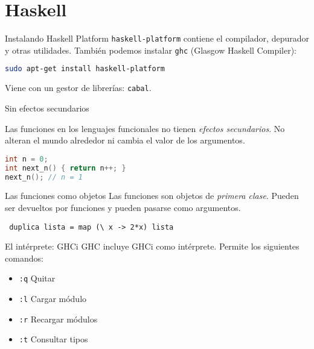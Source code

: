 \section{Haskell}

\begin{frame}[fragile]{Instalando Haskell Platform}
  \texttt{haskell-platform} contiene el compilador, depurador y otras utilidades.
  También podemos instalar \texttt{ghc} (Glasgow Haskell Compiler):
  \espacio
  \begin{lstlisting}[language=bash]
sudo apt-get install haskell-platform
  \end{lstlisting}
  \espacio
  Viene con un gestor de librerías: \texttt{cabal}.
\end{frame}

\begin{frame}[fragile]{Sin efectos secundarios}

    Las funciones en los lenguajes funcionales no tienen \textit{efectos secundarios}.
    No alteran el mundo alrededor ni cambia el valor de los argumentos.
    \espacio
  \begin{lstlisting}[language=C++]
int n = 0;
int next_n() { return n++; }
next_n(); // n = 1
  \end{lstlisting}

\end{frame}

\begin{frame}[fragile]{Las funciones como objetos}
 Las funciones son objetos de \textit{primera clase}. Pueden ser devueltos
 por funciones y pueden pasarse como argumentos.
 
 \begin{lstlisting}
 duplica lista = map (\ x -> 2*x) lista
 \end{lstlisting}


\end{frame}

\begin{frame}{El intérprete: GHCi}
  GHC incluye GHCi como intérprete. Permite los siguientes comandos:
  \espacio
  \begin{itemize}
    \item \texttt{:q} \qquad  Quitar
    \item \texttt{:l} \qquad  Cargar módulo
    \item \texttt{:r} \qquad  Recargar módulos
    \item \texttt{:t} \qquad  Consultar tipos
  \end{itemize}

\end{frame}

